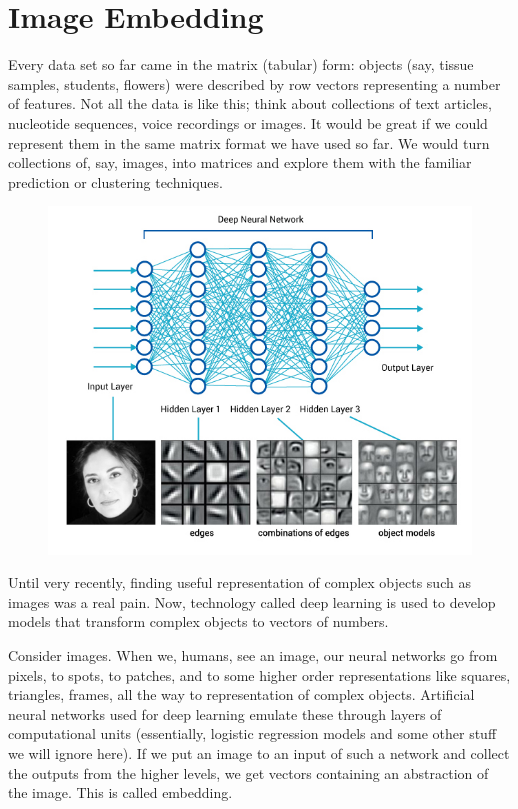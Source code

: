 \chapter{Image Embedding}
\label{ch:image-embedding}

Every data set so far came in the matrix (tabular) form: objects (say, tissue samples, students, flowers) were described by row vectors representing a number of features. Not all the data is like this; think about collections of text articles, nucleotide sequences, voice recordings or images. It would be great if we could represent them in the same matrix format we have used so far. We would turn collections of, say, images, into matrices and explore them with the familiar prediction or clustering techniques.

\begin{figure}
    \includegraphics[scale=0.5]{blog_deeplearning.jpg}
    \label{fig:deep-learning}
\end{figure}

Until very recently, finding useful representation of complex objects such as images was a real pain. Now, technology called deep learning is used to develop models that transform complex objects to vectors of numbers.

Consider images. When we, humans, see an image, our neural networks go from pixels, to spots, to patches, and to some higher order representations like squares, triangles, frames, all the way to representation of complex objects. Artificial neural networks used for deep learning emulate these through layers of computational units (essentially, logistic regression models and some other stuff we will ignore here). If we put an image to an input of such a network and collect the outputs from the higher levels, we get vectors containing an abstraction of the image. This is called embedding.

